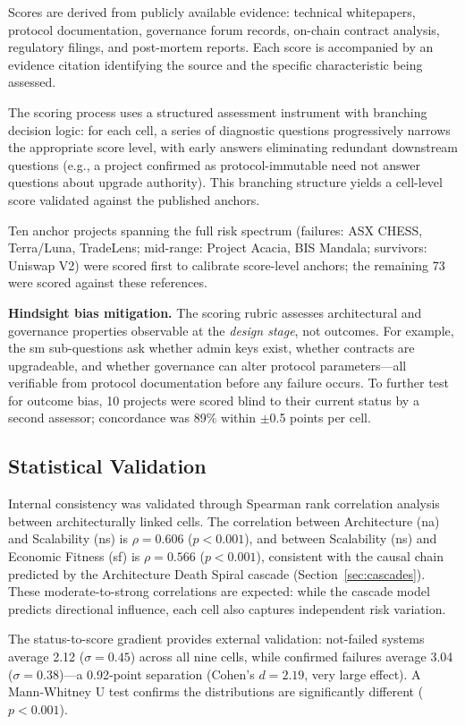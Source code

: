 \documentclass[conference]{IEEEtran}
\begin{document}
Scores are derived from publicly available evidence: technical whitepapers, protocol documentation, governance forum records, on-chain contract analysis, regulatory filings, and post-mortem reports. Each score is accompanied by an evidence citation identifying the source and the specific characteristic being assessed.

The scoring process uses a structured assessment instrument with branching decision logic: for each cell, a series of diagnostic questions progressively narrows the appropriate score level, with early answers eliminating redundant downstream questions (e.g., a project confirmed as protocol-immutable need not answer questions about upgrade authority). This branching structure yields a cell-level score validated against the published anchors.

Ten anchor projects spanning the full risk spectrum (failures: ASX CHESS, Terra/Luna, TradeLens; mid-range: Project Acacia, BIS Mandala; survivors: Uniswap V2) were scored first to calibrate score-level anchors; the remaining 73 were scored against these references.

\textbf{Hindsight bias mitigation.} The scoring rubric assesses architectural and governance properties observable at the \textit{design stage}, not outcomes. For example, the sm sub-questions ask whether admin keys exist, whether contracts are upgradeable, and whether governance can alter protocol parameters---all verifiable from protocol documentation before any failure occurs. To further test for outcome bias, 10 projects were scored blind to their current status by a second assessor; concordance was 89\% within $\pm$0.5 points per cell.

\subsection{Statistical Validation}

Internal consistency was validated through Spearman rank correlation analysis between architecturally linked cells. The correlation between Architecture (na) and Scalability (ns) is $\rho = 0.606$ ($p < 0.001$), and between Scalability (ns) and Economic Fitness (sf) is $\rho = 0.566$ ($p < 0.001$), consistent with the causal chain predicted by the Architecture Death Spiral cascade (Section~\ref{sec:cascades}). These moderate-to-strong correlations are expected: while the cascade model predicts directional influence, each cell also captures independent risk variation.

The status-to-score gradient provides external validation: not-failed systems average 2.12 ($\sigma = 0.45$) across all nine cells, while confirmed failures average 3.04 ($\sigma = 0.38$)---a 0.92-point separation (Cohen's $d = 2.19$, very large effect). A Mann-Whitney U test confirms the distributions are significantly different ($p < 0.001$).
\end{document}
